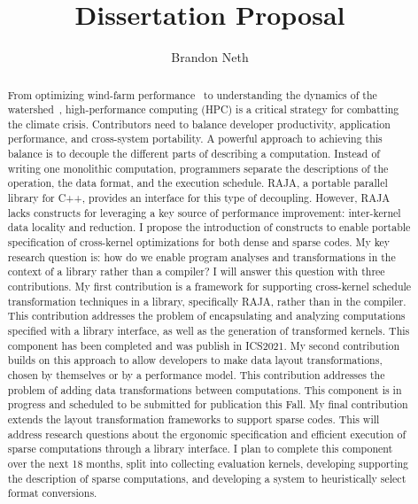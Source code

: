 \documentclass{article}
\author{Brandon Neth}
\title{Dissertation Proposal}
\begin{document}
\maketitle



\begin{abstract}
From optimizing wind-farm performance~\cite{sprague2020exawind} to understanding the dynamics of the watershed~\cite{olschanowsky2019hydroframe,condon2013implementation},
high-performance computing (HPC) is a critical strategy for combatting the climate crisis. 
Contributors need to balance developer productivity, application performance, and cross-system portability.
A powerful approach to achieving this balance is to decouple the different parts of describing a computation. 
Instead of writing one monolithic computation, programmers separate the descriptions of the operation, the data format, and the execution schedule.
RAJA, a portable parallel library for C++, provides an interface for this type of decoupling.
However, RAJA lacks constructs for leveraging a key source of performance improvement: inter-kernel data locality and reduction.
I propose the introduction of constructs to enable portable specification of cross-kernel optimizations for both dense and sparse codes.
My key research question is: how do we enable program analyses and transformations in the context of a library rather than a compiler?
I will answer this question with three contributions.
My first contribution is a framework for supporting cross-kernel schedule transformation techniques in a library, specifically RAJA, rather than in the compiler. 
This contribution addresses the problem of encapsulating and analyzing computations specified with a library interface, as well as the generation of transformed kernels. 
This component has been completed and was publish in ICS2021.
My second contribution builds on this approach to allow developers to make data layout transformations, chosen by themselves or by a performance model.
This contribution addresses the problem of adding data transformations between computations.
This component is in progress and scheduled to be submitted for publication this Fall.
My final contribution extends the layout transformation frameworks to support sparse codes.
This will address research questions about the ergonomic specification and efficient execution of sparse computations through a library interface.
I plan to complete this component over the next 18 months, split into collecting evaluation kernels, developing supporting the description of sparse computations, and developing a system to heuristically select format conversions.
\end{abstract}
\end{document}
